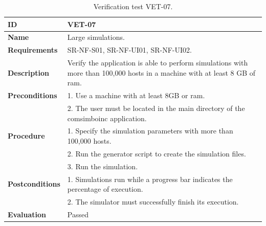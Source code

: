 \begin{center}
\begin{table}[htb]
\centering
\begin{tabular}{@{}p{2.5cm} p{13cm}@{}} 
\toprule
\textbf{ID} 					& VET-07 \\
\midrule
\textbf{Name} 				& Large simulations. \\
\midrule
\textbf{Requirements} 		& SR-NF-S01, SR-NF-UI01, SR-NF-UI02. \\
\midrule
\textbf{Description} 		& Verify the application is able to perform simulations
with more than 100,000 hosts in a machine with at least 8 GB of \gls{ram}. \\
\midrule
\textbf{Preconditions}		& 1. Use a machine with at least 8GB or \gls{ram}. \\
							& 2. The user must be located in the main directory of the \gls{comsimboinc} application. \\
\midrule
\textbf{Procedure}			& 1. Specify the simulation parameters with more than 100,000 hosts. \\
							& 2. Run the generator script to create the simulation files.\\
							& 3. Run the simulation.\\
\midrule
\textbf{Postconditions} 		& 1. Simulations run while a progress bar indicates the percentage of execution. \\
							& 2. The simulator must successfully finish its execution. \\
\midrule
\textbf{Evaluation} 			& Passed \\
\bottomrule
\end{tabular}
\caption{Verification test VET-07.}
\label{tab:vet07}
\end{table}
\end{center}


